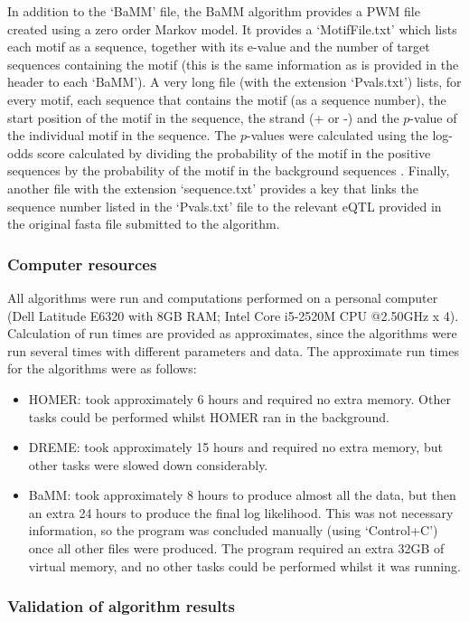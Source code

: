 \documentclass[12pt]{article}
\begin{document}
In addition to the `BaMM' file, the BaMM algorithm provides a PWM file created using a zero order Markov model. It provides a `MotifFile.txt' which lists each motif as a sequence, together with its e-value and the number of target sequences containing the motif (this is the same information as is provided in the header to each `BaMM'). A very long file (with the extension `Pvals.txt') lists, for every motif, each sequence that contains the motif (as a sequence number), the start position of the motif in the sequence, the strand (+ or -) and the $p$-value of the individual motif in the sequence. The $p$-values were calculated using the log-odds score calculated by dividing the probability of the motif in the positive sequences by the probability of the motif in the background sequences \citep{siebert2016bayesian}. Finally, another file with the extension `sequence.txt' provides a key that links the sequence number listed in the `Pvals.txt' file to the relevant eQTL provided in the original fasta file submitted to the algorithm. 

\subsubsection{Computer resources}

All algorithms were run and computations performed on a personal computer (Dell Latitude E6320 with 8GB RAM; Intel Core i5-2520M CPU @2.50GHz x 4). Calculation of run times are provided as approximates, since the algorithms were run several times with different parameters and data. The approximate run times for the algorithms were as follows:
\begin{itemize}
\item HOMER: took approximately 6 hours and required no extra memory. Other tasks could be performed whilst HOMER ran in the background.
\item DREME: took approximately 15 hours and required no extra memory, but other tasks were slowed down considerably.
\item BaMM: took approximately 8 hours to produce almost all the data, but then an extra 24 hours to produce the final log likelihood. This was not necessary information, so the program was concluded manually (using `Control+C') once all other files were produced. The program required an extra 32GB of virtual memory, and no other tasks could be performed whilst it was running.
\end{itemize}


\subsubsection{Validation of algorithm results}
\end{document}
